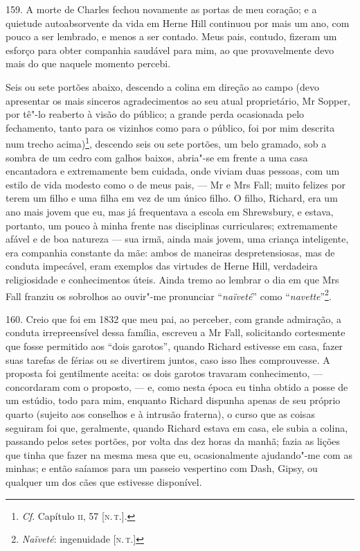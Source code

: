 159. A morte de Charles fechou novamente as portas de meu coração; e a
quietude autoabsorvente da vida em Herne Hill continuou por mais um ano,
com pouco a ser lembrado, e menos a ser contado. Meus pais, contudo,
fizeram um esforço para obter companhia saudável para mim, ao que
provavelmente devo mais do que naquele momento percebi.

Seis ou sete portões abaixo, descendo a colina em direção ao campo (devo
apresentar os mais sinceros agradecimentos ao seu atual proprietário, Mr
Sopper, por tê"-lo reaberto à visão do público; a grande perda ocasionada
pelo fechamento, tanto para os vizinhos como para o público, foi por mim
descrita num trecho acima)\footnote{\emph{Cf}. Capítulo \textsc{ii}, 57 {[}\textsc{n.\,t.}{]}.}, descendo seis ou sete portões, um belo gramado, sob a sombra
de um cedro com galhos baixos, abria"-se em frente a uma casa encantadora
e extremamente bem cuidada, onde viviam duas pessoas, com um estilo de
vida modesto como o de meus pais, --- Mr e Mrs Fall; muito felizes por
terem um filho e uma filha em vez de um único filho. O filho, Richard,
era um ano mais jovem que eu, mas já frequentava a escola em Shrewsbury,
e estava, portanto, um pouco à minha frente nas disciplinas
curriculares; extremamente afável e de boa natureza --- sua irmã, ainda
mais jovem, uma criança inteligente, era companhia constante da mãe:
ambos de maneiras despretensiosas, mas de conduta impecável, eram
exemplos das virtudes de Herne Hill, verdadeira religiosidade e
conhecimentos úteis. Ainda tremo ao lembrar o dia em que Mrs Fall
franziu os sobrolhos ao ouvir"-me pronunciar ``\emph{naïveté}'' como
``\emph{navette}''\footnote{\emph{Naïveté}: ingenuidade {[}\textsc{n.\,t.}{]}}.

160. Creio que foi em 1832 que meu pai, ao perceber, com grande
admiração, a conduta irrepreensível dessa família, escreveu a Mr Fall,
solicitando cortesmente que fosse permitido aos ``dois garotos'', quando
Richard estivesse em casa, fazer suas tarefas de férias ou se divertirem
juntos, caso isso lhes comprouvesse. A proposta foi gentilmente aceita:
os dois garotos travaram conhecimento, --- concordaram com o proposto, ---
e, como nesta época eu tinha obtido a posse de um estúdio, todo para
mim, enquanto Richard dispunha apenas de seu próprio quarto (sujeito aos
conselhos e à intrusão fraterna), o curso que as coisas seguiram foi
que, geralmente, quando Richard estava em casa, ele subia a colina,
passando pelos setes portões, por volta das dez horas da manhã; fazia as
lições que tinha que fazer na mesma mesa que eu, ocasionalmente
ajudando"-me com as minhas; e então saíamos para um passeio vespertino
com Dash, Gipsy, ou qualquer um dos cães que estivesse disponível.

